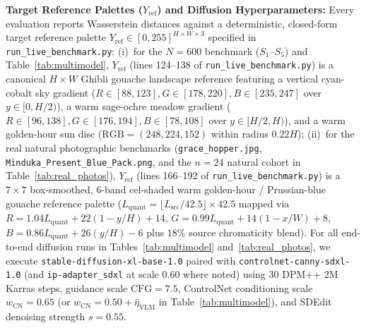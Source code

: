 \documentclass[conference,10pt]{IEEEtran}
\begin{document}
\textbf{Target Reference Palettes ($Y_{\text{ref}}$) and Diffusion Hyperparameters:} Every evaluation reports Wasserstein distances against a deterministic, closed-form target reference palette $Y_{\text{ref}} \in [0,255]^{H\times W\times 3}$ specified in \texttt{run\_live\_benchmark.py}: (i)~for the $N=600$ benchmark ($S_1\text{--}S_5$) and Table~\ref{tab:multimodel}, $Y_{\text{ref}}$ (lines 124--138 of \texttt{run\_live\_benchmark.py}) is a canonical $H\times W$ Ghibli gouache landscape reference featuring a vertical cyan-cobalt sky gradient ($R \in [88,123], G \in [178,220], B \in [235,247]$ over $y \in [0, H/2)$), a warm sage-ochre meadow gradient ($R \in [96,138], G \in [176,194], B \in [78,108]$ over $y \in [H/2, H)$), and a warm golden-hour sun disc ($\mathrm{RGB}=(248, 224, 152)$ within radius $0.22H$); (ii)~for the real natural photographic benchmarks (\texttt{grace\_hopper.jpg}, \texttt{Minduka\_Present\_Blue\_Pack.png}, and the $n=24$ natural cohort in Table~\ref{tab:real_photos}), $Y_{\text{ref}}$ (lines 166--192 of \texttt{run\_live\_benchmark.py}) is a $7\times 7$ box-smoothed, 6-band cel-shaded warm golden-hour / Prussian-blue gouache reference palette ($L_{\text{quant}} = \lfloor L_{\text{src}} / 42.5 \rfloor \times 42.5$ mapped via $R = 1.04 L_{\text{quant}} + 22(1 - y/H) + 14$, $G = 0.99 L_{\text{quant}} + 14(1 - x/W) + 8$, $B = 0.86 L_{\text{quant}} + 26(y/H) - 6$ plus $18\%$ source chromaticity blend). For all end-to-end diffusion runs in Tables~\ref{tab:multimodel} and~\ref{tab:real_photos}, we execute \texttt{stable-diffusion-xl-base-1.0} paired with \texttt{controlnet-canny-sdxl-1.0} (and \texttt{ip-adapter\_sdxl} at scale $0.60$ where noted) using $30$ DPM++ 2M Karras steps, guidance scale $\mathrm{CFG}=7.5$, ControlNet conditioning scale $w_{\text{CN}} = 0.65$ (or $w_{\text{CN}} = 0.50 + \hat{\eta}_{\text{VLM}}$ in Table~\ref{tab:multimodel}), and SDEdit denoising strength $s = 0.55$.
\end{document}
